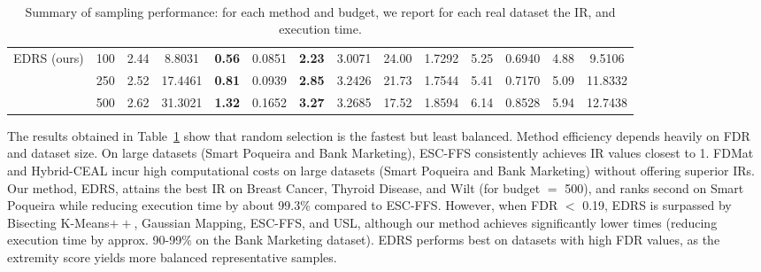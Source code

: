 \documentclass[preprint,12pt]{elsarticle}
\begin{document}
\begin{table}[!t]
{\begin{tabular}{cc|cc|cc|cc|cc|cc|cc}
\multirow{3}{*}{EDRS (ours)}           & 100    & 2.44            & 8.8031            & \textbf{0.56}   & 0.0851           & \textbf{2.23}    & 3.0071           & 24.00          & 1.7292           & 5.25            & 0.6940           & 4.88            & 9.5106           \\
                                       & 250    & 2.52            & 17.4461           & \textbf{0.81}   & 0.0939           & \textbf{2.85}    & 3.2426           & 21.73          & 1.7544           & 5.41            & 0.7170           & 5.09            & 11.8332          \\
                                       & 500    & 2.62            & 31.3021           & \textbf{1.32}   & 0.1652           & \textbf{3.27}    & 3.2685           & 17.52 & 1.8594           & 6.14            & 0.8528           & 5.94            & 12.7438          \\ \hline
\end{tabular}
}
\caption{\\ Summary of sampling performance: for each method and budget, we report for each real dataset the IR, and execution time.}
\label{tab:methods_dataset}
\end{table}

The results obtained in Table~\ref{tab:methods_dataset} show that random selection is the fastest but least balanced. Method efficiency depends heavily on FDR and dataset size. On large datasets (Smart Poqueira and Bank Marketing), ESC-FFS consistently achieves IR values closest to 1. FDMat and Hybrid-CEAL incur high computational costs on large datasets (Smart Poqueira and Bank Marketing) without offering superior IRs. Our method, EDRS, attains the best IR on Breast Cancer, Thyroid Disease, and Wilt (for budget $=$ 500), and ranks second on Smart Poqueira while reducing execution time by about 99.3\% compared to ESC-FFS. However, when FDR $<$ 0.19, EDRS is surpassed by Bisecting K-Means$++$, Gaussian Mapping, ESC-FFS, and USL, although our method achieves significantly lower times (reducing execution time by approx. 90-99\% on the Bank Marketing dataset). EDRS performs best on datasets with high FDR values, as the extremity score yields more balanced representative samples.
\end{document}
